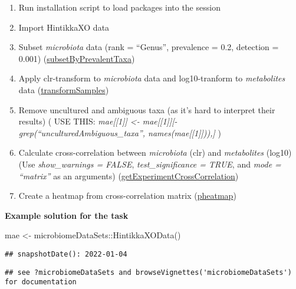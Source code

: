 \documentclass[
  oneside]{book}
\newenvironment{Shaded}{\begin{snugshade}}{\end{snugshade}}
\newcommand{\FunctionTok}[1]{\textcolor[rgb]{0.00,0.00,0.00}{#1}}
\newcommand{\NormalTok}[1]{#1}
\newcommand{\OtherTok}[1]{\textcolor[rgb]{0.56,0.35,0.01}{#1}}
\newcommand{\SpecialCharTok}[1]{\textcolor[rgb]{0.00,0.00,0.00}{#1}}
\begin{document}
\begin{enumerate}
\def\labelenumi{\arabic{enumi}.}
\item
  Run installation script to load packages into the session
\item
  Import HintikkaXO data
\item
  Subset \emph{microbiota} data (rank = ``Genus'', prevalence = 0.2, detection = 0.001) (\href{https://microbiome.github.io/OMA/differential-abundance.html\#prevalence-filtering}{subsetByPrevalentTaxa})
\item
  Apply clr-transform to \emph{microbiota} data and log10-tranform to \emph{metabolites} data (\href{https://microbiome.github.io/OMA/taxonomic-information.html\#data-transformation}{transformSamples})
\item
  Remove uncultured and ambiguous taxa (as it's hard to interpret their results) ( USE THIS: \emph{mae{[}{[}1{]}{]} \textless- mae{[}{[}1{]}{]}{[}-grep(``uncultured\textbar Ambiguous\_taxa'', names(mae{[}{[}1{]}{]})),{]}} )
\item
  Calculate cross-correlation between \emph{microbiota} (clr) and \emph{metabolites} (log10) (Use \emph{show\_warnings = FALSE}, \emph{test\_significance = TRUE}, and \emph{mode = ``matrix''} as an arguments)
  (\href{https://microbiome.github.io/OMA/multi-assay_analyses.html\#multi-assay_analyses}{getExperimentCrossCorrelation})
\item
  Create a heatmap from cross-correlation matrix (\href{https://microbiome.github.io/OMA/microbiome-community.html\#composition-heatmap}{pheatmap})
\end{enumerate}

\textbf{Example solution for the task}

\begin{Shaded}
\begin{Highlighting}[]
\NormalTok{mae }\OtherTok{\textless{}{-}}\NormalTok{ microbiomeDataSets}\SpecialCharTok{::}\FunctionTok{HintikkaXOData}\NormalTok{()}
\end{Highlighting}
\end{Shaded}

\begin{verbatim}
## snapshotDate(): 2022-01-04
\end{verbatim}

\begin{verbatim}
## see ?microbiomeDataSets and browseVignettes('microbiomeDataSets') for documentation
\end{verbatim}
\end{document}
